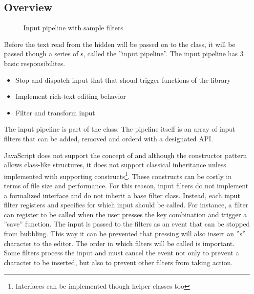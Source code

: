 \subsection{Overview} 
\label{subsec:input_pipeline_overview}

\begin{figure}[!htb]
\centering
{}
\caption{Input pipeline with sample filters}
\label{fig:type_base_components}
\end{figure}

Before the text read from the hidden  will be passed on to the  class, it will be passed though a series of s, called the ''input pipeline''. The input pipeline has 3 basic responsibilites.

\begin{itemize}
\item Stop and dispatch input that that shoud trigger functions of the library
\item Implement rich-text editing behavior
\item Filter and transform input
\end{itemize}

The input pipeline is part of the  class. The pipeline itself is an array of input filters that can be added, removed and orderd with a designated API.

JavaScript does not support the concept of  and although the constructor pattern allows class-like structures, it does not support classical inheritance unless implemented with supporting constructs\footnote{Interfaces can be implemented though helper classes too}. These constructs can be costly in terms of file size and performance. For this reason, input filters do not implement a formalized interface and do not inherit a base filter class. Instead, each input filter registers and specifies for which input should be called. For instance, a filter can register to be called when the user presses the  key combination and trigger a ''save'' function. The input is passed to the filters as an event that can be stopped from bubbling. This way it can be prevented that pressing  will also insert an ''s'' character to the editor. The order in which filters will be called is important. Some filters process the input and must cancel the event not only to prevent a character to be inserted, but also to prevent other filters from taking action.


